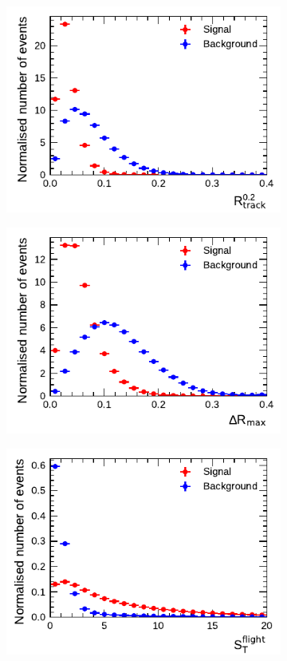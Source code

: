 \begin{figure}[!ht]
\begin{subfigure}{0.5\textwidth}
    \includegraphics{./figures/baseline_bdt_vars/3p/innerTrkAvgDist.pdf}
  \end{subfigure}%
  \begin{subfigure}{0.5\textwidth}
    \centering
    \includegraphics{./figures/baseline_bdt_vars/3p/dRmax.pdf}
  \end{subfigure}
  \begin{subfigure}{0.5\textwidth}
    \centering
    \includegraphics{./figures/baseline_bdt_vars/3p/trFlightPathSig.pdf}

\end{subfigure}
\end{figure}

